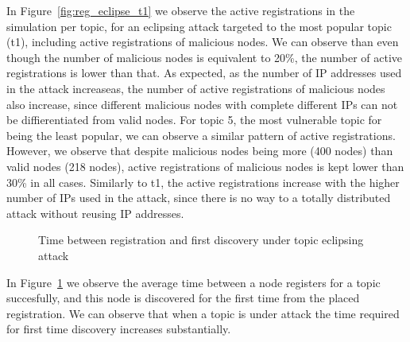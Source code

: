 In Figure~\ref{fig:reg_eclipse_t1} we observe the active registrations in the simulation per topic, for an eclipsing attack targeted to the most popular topic (t1), including active registrations of malicious nodes.
We can observe than even though the number of malicious nodes is equivalent to 20\%, the number of active registrations is lower than that. 
As expected, as the number of IP addresses used in the attack increaseas, the number of active registrations of malicious nodes also increase, since different malicious nodes with complete different IPs can not be diffierentiated from valid nodes.
For topic 5, the most vulnerable topic for being the least popular, we can observe a similar pattern of active registrations. 
However, we observe that despite malicious nodes being more (400 nodes) than valid nodes (218 nodes), active registrations of malicious nodes is kept lower than 30\% in all cases. Similarly to t1, the active registrations increase with the higher number of IPs used in the attack, since there is no way to a totally distributed attack without reusing IP addresses.


\begin{figure}[!h]
\centering
{} 
\hspace{-0.16cm}
 \caption{Time between registration and first discovery under topic eclipsing attack} 
\label{fig:discoverytime_eclipse}
\vspace{-0.15in}
\end{figure}   

In Figure~\ref{fig:discoverytime_eclipse} we observe the average time between a node registers for a topic succesfully, and this node is discovered for the first time from the placed registration.
We can observe that when a topic is under attack the time required for first time discovery increases substantially.

